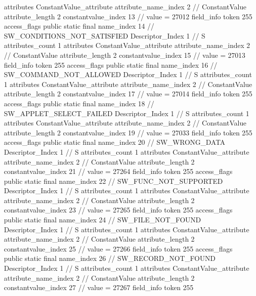 {{{{{				attributes {
				ConstantValue_attribute {
					attribute_name_index	2		// ConstantValue
					attribute_length	2
					constantvalue_index	13		// value = 27012
				}
				}
			}
			field_info {
				token	255
				access_flags	public static final
				name_index	14		// SW_CONDITIONS_NOT_SATISFIED
				Descriptor_Index	1		// S
				attributes_count	1
				attributes {
				ConstantValue_attribute {
					attribute_name_index	2		// ConstantValue
					attribute_length	2
					constantvalue_index	15		// value = 27013
				}
				}
			}
			field_info {
				token	255
				access_flags	public static final
				name_index	16		// SW_COMMAND_NOT_ALLOWED
				Descriptor_Index	1		// S
				attributes_count	1
				attributes {
				ConstantValue_attribute {
					attribute_name_index	2		// ConstantValue
					attribute_length	2
					constantvalue_index	17		// value = 27014
				}
				}
			}
			field_info {
				token	255
				access_flags	public static final
				name_index	18		// SW_APPLET_SELECT_FAILED
				Descriptor_Index	1		// S
				attributes_count	1
				attributes {
				ConstantValue_attribute {
					attribute_name_index	2		// ConstantValue
					attribute_length	2
					constantvalue_index	19		// value = 27033
				}
				}
			}
			field_info {
				token	255
				access_flags	public static final
				name_index	20		// SW_WRONG_DATA
				Descriptor_Index	1		// S
				attributes_count	1
				attributes {
				ConstantValue_attribute {
					attribute_name_index	2		// ConstantValue
					attribute_length	2
					constantvalue_index	21		// value = 27264
				}
				}
			}
			field_info {
				token	255
				access_flags	public static final
				name_index	22		// SW_FUNC_NOT_SUPPORTED
				Descriptor_Index	1		// S
				attributes_count	1
				attributes {
				ConstantValue_attribute {
					attribute_name_index	2		// ConstantValue
					attribute_length	2
					constantvalue_index	23		// value = 27265
				}
				}
			}
			field_info {
				token	255
				access_flags	public static final
				name_index	24		// SW_FILE_NOT_FOUND
				Descriptor_Index	1		// S
				attributes_count	1
				attributes {
				ConstantValue_attribute {
					attribute_name_index	2		// ConstantValue
					attribute_length	2
					constantvalue_index	25		// value = 27266
				}
				}
			}
			field_info {
				token	255
				access_flags	public static final
				name_index	26		// SW_RECORD_NOT_FOUND
				Descriptor_Index	1		// S
				attributes_count	1
				attributes {
				ConstantValue_attribute {
					attribute_name_index	2		// ConstantValue
					attribute_length	2
					constantvalue_index	27		// value = 27267
				}
				}
			}
			field_info {
				token	255
}}}}}
